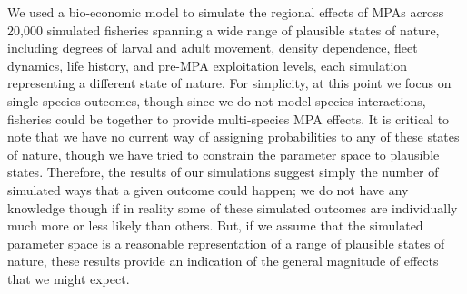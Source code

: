 \documentclass[twoside,12pt,final]{ucthesis-CA2012}
\begin{document}
\begin{ucmainmatter}
We used a bio-economic model to simulate the regional effects of MPAs
across 20,000 simulated fisheries spanning a wide range of plausible
states of nature, including degrees of larval and adult movement,
density dependence, fleet dynamics, life history, and pre-MPA
exploitation levels, each simulation representing a different state of
nature. For simplicity, at this point we focus on single species
outcomes, though since we do not model species interactions, fisheries
could be together to provide multi-species MPA effects. It is critical
to note that we have no current way of assigning probabilities to any of
these states of nature, though we have tried to constrain the parameter
space to plausible states. Therefore, the results of our simulations
suggest simply the number of simulated ways that a given outcome could
happen; we do not have any knowledge though if in reality some of these
simulated outcomes are individually much more or less likely than
others. But, if we assume that the simulated parameter space is a
reasonable representation of a range of plausible states of nature,
these results provide an indication of the general magnitude of effects
that we might expect.


\end{ucmainmatter}
\end{document}
